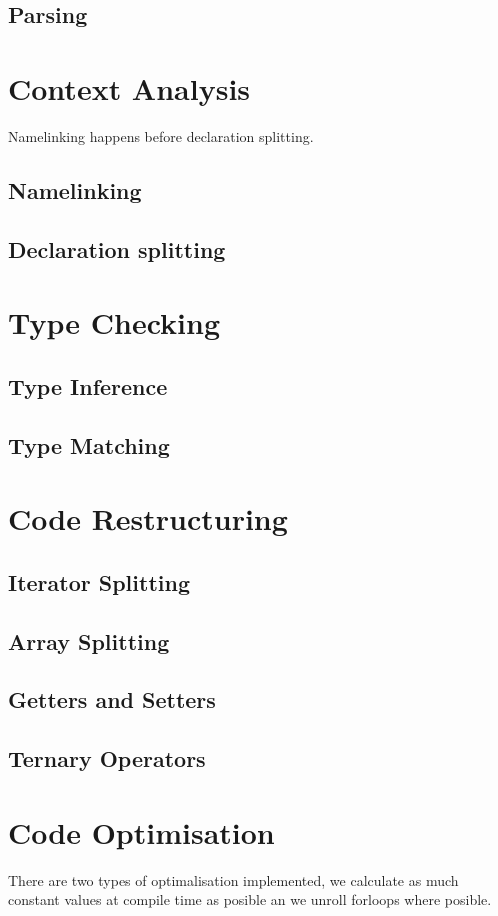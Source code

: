 \documentclass[a4paper,11pt]{report}
\begin{document}
\subsection{Parsing}

\section{Context Analysis}
Namelinking happens before declaration splitting.
\subsection{Namelinking}
\subsection{Declaration splitting}

\section{Type Checking}
\subsection{Type Inference}
\subsection{Type Matching}

\section{Code Restructuring}
\subsection{Iterator Splitting}
\subsection{Array Splitting}
\subsection{Getters and Setters}
\subsection{Ternary Operators}

\section{Code Optimisation}
There are two types of optimalisation implemented, we calculate as much constant values at compile time as posible an we unroll forloops where posible.
\end{document}

